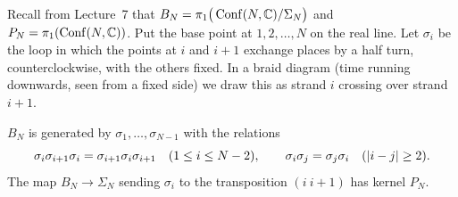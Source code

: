 Recall from Lecture~7 that $B_N=\pi_1\big(\operatorname{Conf}(N,\mathbb{C})/\Sigma_N\big)$ and $P_N=\pi_1(\operatorname{Conf}(N,\mathbb{C}))$. Put the base
point at $1,2,\dots,N$ on the real line. Let $\sigma_i$ be the loop in which the points at $i$ and $i+1$
exchange places by a half turn, counterclockwise, with the others fixed. In a braid diagram (time
running downwards, seen from a fixed side) we draw this as strand $i$ crossing over strand $i+1$.

\begin{theorem}[Artin 1925, 1947]\label{TOP:thm:artin}
$B_N$ is generated by $\sigma_1,\dots,\sigma_{N-1}$ with the relations
\[
  \sigma_i\sigma_{i+1}\sigma_i=\sigma_{i+1}\sigma_i\sigma_{i+1}\quad(1\le i\le N-2),\qquad
  \sigma_i\sigma_j=\sigma_j\sigma_i\quad(\left\lvert i-j \right\rvert\ge2).
\]
The map $B_N\to\Sigma_N$ sending $\sigma_i$ to the transposition $(i\ i{+}1)$ has kernel $P_N$.
\end{theorem}


